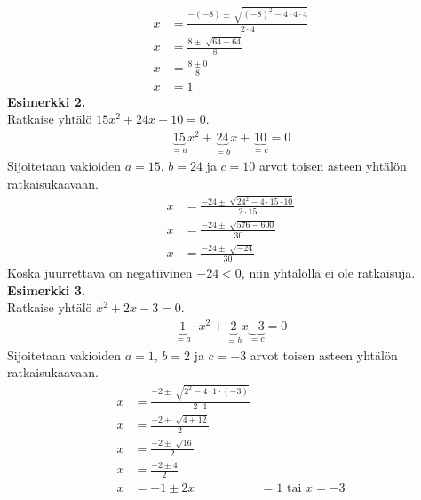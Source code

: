 \begin{align*}
x&=\frac{-(-8)\pm \sqrt[]{(-8)^2-4\cdot 4 \cdot 4}}{2 \cdot 4} \\
x&=\frac{8 \pm \sqrt[]{64- 64}}{8} \\
x&=\frac{8 \pm 0}{8} \\
x&=1
\end{align*}
\textbf{Esimerkki 2.} \\
Ratkaise yhtälö $15x^2+24x+10=0$.
\begin{align*}
\underbrace{15}_{=a}x^2+\underbrace{24}_{=b}x+\underbrace{10}_{=c}=0 
\end{align*}
Sijoitetaan vakioiden $a=15$, $b=24$ ja $c=10$ arvot toisen asteen yhtälön ratkaisukaavaan.
\begin{align*}
x&=\frac{-24 \pm \sqrt[]{24^2-4 \cdot 15 \cdot 10}}{2 \cdot 15} \\
x&=\frac{-24 \pm \sqrt[]{576-600}}{30} \\
x&=\frac{-24 \pm \sqrt[]{-24}}{30}
\end{align*}
Koska juurrettava on negatiivinen $-24<0$, niin yhtälöllä ei ole ratkaisuja. \\ 
\textbf{Esimerkki 3.} \\
Ratkaise yhtälö $x^2+2x-3=0$. 
\begin{align*}
\underbrace{1}_{=a} \cdot x^2+\underbrace{2}_{=b}x\underbrace{-3}_{=c}=0 
\end{align*}
Sijoitetaan vakioiden $a=1$, $b=2$ ja $c=-3$ arvot toisen asteen yhtälön ratkaisukaavaan.
\begin{align*}
x&=\frac{-2 \pm \sqrt[]{2^2-4 \cdot 1 \cdot (-3)}}{2 \cdot 1} \\
x&=\frac{-2 \pm \sqrt[]{4+12}}{2} \\
x&=\frac{-2 \pm \sqrt[]{16}}{2} \\
x&=\frac{-2 \pm 4}{2} \\
x&=-1 \pm 2
x&=1 \text{ tai } x=-3
\end{align*}


